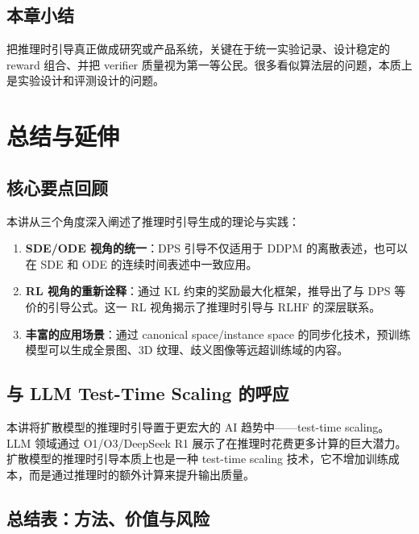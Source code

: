 \documentclass[a4paper]{article}
\begin{document}
\subsection{本章小结}

把推理时引导真正做成研究或产品系统，关键在于统一实验记录、设计稳定的 reward 组合、并把 verifier 质量视为第一等公民。很多看似算法层的问题，本质上是实验设计和评测设计的问题。

\section{总结与延伸}

\subsection{核心要点回顾}

本讲从三个角度深入阐述了推理时引导生成的理论与实践：

\begin{enumerate}
    \item \textbf{SDE/ODE 视角的统一}：DPS 引导不仅适用于 DDPM 的离散表述，也可以在 SDE 和 ODE 的连续时间表述中一致应用。
    \item \textbf{RL 视角的重新诠释}：通过 KL 约束的奖励最大化框架，推导出了与 DPS 等价的引导公式。这一 RL 视角揭示了推理时引导与 RLHF 的深层联系。
    \item \textbf{丰富的应用场景}：通过 canonical space/instance space 的同步化技术，预训练模型可以生成全景图、3D 纹理、歧义图像等远超训练域的内容。
\end{enumerate}

\subsection{与 LLM Test-Time Scaling 的呼应}

本讲将扩散模型的推理时引导置于更宏大的 AI 趋势中——test-time scaling。LLM 领域通过 O1/O3/DeepSeek R1 展示了在推理时花费更多计算的巨大潜力。扩散模型的推理时引导本质上也是一种 test-time scaling 技术，它不增加训练成本，而是通过推理时的额外计算来提升输出质量。

\subsection{总结表：方法、价值与风险}
\end{document}

